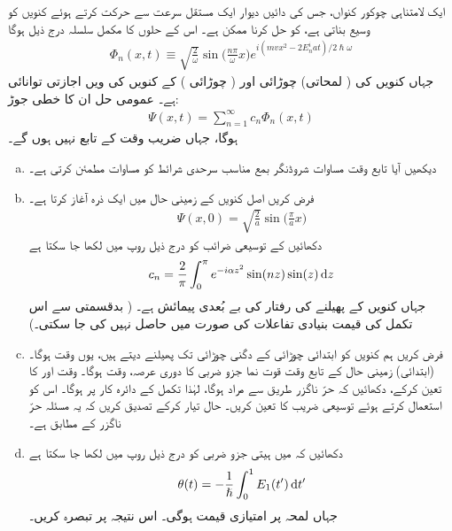ایک لامتناہی چوکور کنواں، جس کی دائیں دیوار ایک مستقل سرعت  سے حرکت کرتے ہوئے کنویں کو وسیع بناتی ہے، کو  حل کرنا ممکن ہے۔ اس کے حلوں کا مکمل سلسلہ درج ذیل ہوگا 
\begin{align}\label{مساوات_حر_مکمل_حل_چوکور_کنواں}
\Phi_n (x, t) \equiv \sqrt{\frac{2}{\omega}} \sin \big ( \frac{n \pi}{\omega} x \big ) e^{i(mvx^2 -2E_n^i at)/2\hslash \omega}
\end{align}
جہاں  کنویں کی ( لمحاتی) چوڑائی اور  ( چوڑائی ) کے  کنویں کی  ویں اجازتی توانائی ہے۔ عمومی حل ان  کا خطی جوڑ:
\begin{align}
\Psi (x, t) = \sum_{n = 1}^{\infty} c_n \Phi_n (x, t)
\end{align}
ہوگا، جہاں  ضریب   وقت  کے تابع نہیں ہوں گے۔
\begin{enumerate}[a.]
\item
دیکھیں آیا تابع وقت مساوات شروڈنگر بمع مناسب سرحدی شرائط کو مساوات  مطمئن کرتی ہے۔
\item
فرض کریں اصل کنویں کے زمینی حال میں ایک ذرہ آغاز  کرتا ہے۔
\begin{align*}
\Psi (x, 0) = \sqrt{\frac{2}{a}} \sin \big ( \frac{\pi}{a} x \big )
\end{align*}
دکھائیں کے توسیعی ضرائب کو درج ذیل روپ میں لکھا جا سکتا ہے 
\begin{align}
c_n = \frac{2}{\pi} \int_0^{\pi} e^{-i\alpha z^2} \sin(nz) \sin(z) \dif z
\end{align}
جہاں  کنویں کے پھیلنے کی رفتار کی بے بُعدی پیمائش ہے۔ ( بدقسمتی سے اس تکمل کی قیمت بنیادی تفاعلات کی صورت میں حاصل نہیں کی جا سکتی۔) 
\item
فرض کریں ہم کنویں کو ابتدائی چوڑائی کے دگنی چوڑائی تک پھیلنے دیتے ہیں، یوں  وقت  ہوگا۔ (ابتدائی) زمینی حال کے تابع وقت قوت نما جزو ضربی کا دوری عرصہ،  وقت ہوگا۔ وقت  اور  کا تعین کرکے، دکھائیں کہ حرّ ناگزر طریق سے مراد  ہوگا، لہٰذا تکمل کے
 دائرہ کار پر  ہوگا۔ اس کو استعمال کرتے ہوئے توسیعی  ضریب   کا تعین کریں۔ حال  تیار کرکے تصدیق کریں کہ یہ مسئلہ حرّ ناگزر کے مطابق ہے۔
\item
دکھائیں کہ  میں ہیتی جزو ضربی کو درج ذیل روپ میں لکھا جا سکتا ہے 
\begin{align}
\theta (t) = - \frac{1}{\hslash} \int_0^1 E_1 (t') \dif t'
\end{align}
جہاں لمحہ  پر  امتیازی قیمت  ہوگی۔ اس نتیجہ پر تبصرہ کریں۔
\end{enumerate}
